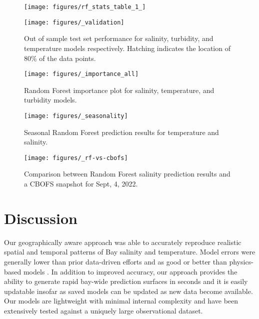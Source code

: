 \documentclass{article}
\begin{document}
\begin{figure}[ht!]
    \begin{center}
          \texttt{[image: figures/rf\_stats\_table\_1\_]}          
    \end{center}    
\end{figure}

\begin{figure}[ht!]
    \begin{center}
          \texttt{[image: figures/\_validation]}
          \caption{Out of sample test set performance for salinity, turbidity, and temperature models respectively. Hatching indicates the location of 80\% of the data points.}
    \end{center}    
\end{figure}

\begin{figure}[ht!]
    \begin{center}
          \texttt{[image: figures/\_importance\_all]}
          \caption{Random Forest importance plot for salinity, temperature, and turbidity models.}
    \end{center}    
\end{figure}

\begin{figure}[ht!]
    \begin{center}
          \texttt{[image: figures/\_seasonality]}
          \caption{Seasonal Random Forest prediction results for temperature and salinity.}
    \end{center}    
\end{figure}

\begin{figure}[ht!]
    \begin{center}
          \texttt{[image: figures/\_rf-vs-cbofs]}
          \caption{Comparison between Random Forest salinity prediction results and a CBOFS snapshot for Sept, 4, 2022.}
    \end{center}    
\end{figure}

\section{Discussion}

Our geographically aware approach was able to accurately reproduce realistic spatial and temporal patterns of Bay salinity and temperature. Model errors were generally lower than prior data-driven efforts and as good or better than physics-based models \citep{vogelAssessingSatelliteSea2016}. In addition to improved accuracy, our approach provides the ability to generate rapid bay-wide prediction surfaces in seconds and it is easily updatable insofar as saved models can be updated as new data become available. Our models are lightweight with minimal internal complexity and have been extensively tested against a uniquely large observational dataset.
\end{document}
